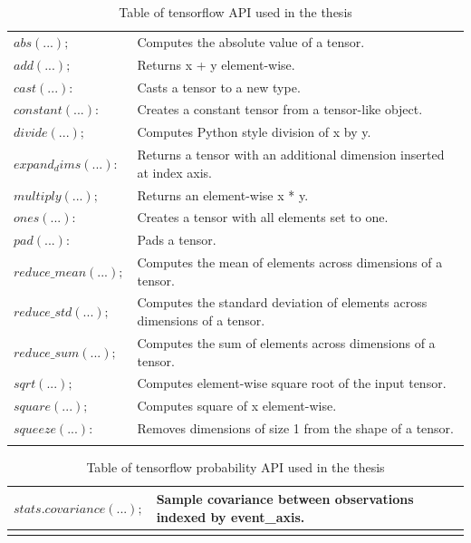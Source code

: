 \documentclass[12pt]{report}
\begin{document}
\begin{longtable}{ p{} | p{}} 
\caption{Table of tensorflow API used in the thesis}\\
\hline
$abs(...);$ & Computes the absolute value of a tensor. \\

$add(...);$ & Returns x + y element-wise. \\ 

$cast(...):$ & Casts a tensor to a new type.\\

$constant(...):$ & Creates a constant tensor from a tensor-like object. \\

$divide(...);$ & Computes Python style division of x by y. \\ 

$expand_dims(...):$ & Returns a tensor with an additional dimension inserted at index axis. \\

$multiply(...);$ & Returns an element-wise x * y. \\ 

$ones(...):$ & Creates a tensor with all elements set to one. \\

$pad(...):$ & Pads a tensor. \\

$reduce\_mean(...);$ & Computes the mean of elements across dimensions of a tensor. \\ 

$reduce\_std(...);$ & Computes the standard deviation of elements across dimensions of a tensor. \\ 

$reduce\_sum(...);$ & Computes the sum of elements across dimensions of a tensor. \\ 

$sqrt(...);$ & Computes element-wise square root of the input tensor. \\ 

$square(...);$ & Computes square of x element-wise. \\ 

$squeeze(...):$ & Removes dimensions of size 1 from the shape of a tensor.\\
\hline
\label{tab:tensorflowapi}
\end{longtable}

\begin{longtable}{ p{} | p{}} 
\caption{Table of tensorflow probability API used in the thesis}\\
\hline
$stats.covariance(...);$ & Sample covariance between observations indexed by event\_axis. \\ 
\hline
\label{tab:tensorflowprobability}
\end{longtable}
\end{document}
